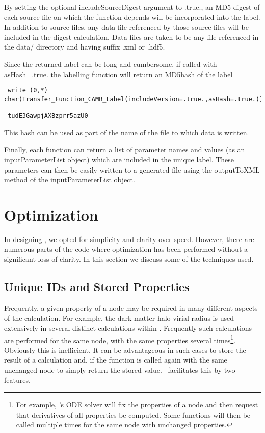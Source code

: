 By setting the optional {\normalfont \ttfamily includeSourceDigest} argument to {\normalfont \ttfamily .true.}, an MD5 digest of each source file on which the function depends will be incorporated into the label. In addition to source files, any data file referenced by those source files will be included in the digest calculation. Data files are taken to be any file referenced in the {\normalfont \ttfamily data/} directory and having suffix {\normalfont \ttfamily .xml} or {\normalfont \ttfamily .hdf5}.

Since the returned label can be long and cumbersome, if called with {\normalfont \ttfamily asHash=.true.} the labelling function will return an \gls{MD5hash} of the label
\begin{verbatim}
 write (0,*) char(Transfer_Function_CAMB_Label(includeVersion=.true.,asHash=.true.))
 
 tudE3GawpjAXBzprr5azU0
\end{verbatim}
This hash can be used as part of the name of the file to which data is written.

Finally, each function can return a list of parameter names and values (as an {\normalfont \ttfamily inputParameterList} object) which are included in the unique label. These parameters can then be easily written to a generated file using the {\normalfont \ttfamily outputToXML} method of the {\normalfont \ttfamily inputParameterList} object.

\section{Optimization}\label{sec:Optimization}

In designing \glc, we opted for simplicity and clarity over speed. However, there are numerous parts of the code where optimization has been performed without a significant loss of clarity. In this section we discuss some of the techniques used.

\subsection{Unique IDs and Stored Properties}

Frequently, a given property of a node may be required in many different aspects of the calculation. For example, the dark matter halo virial radius is used extensively in several distinct calculations within \glc. Frequently such calculations are performed for the same node, with the same properties several times\footnote{For example, \glc's ODE solver will fix the properties of a node and then request that derivatives of all properties be computed. Some functions will then be called multiple times for the same node with unchanged properties.}. Obviously this is inefficient. It can be advantageous in such cases to store the result of a calculation and, if the function is called again with the same unchanged node to simply return the stored value. \glc\ facilitates this by two features.

